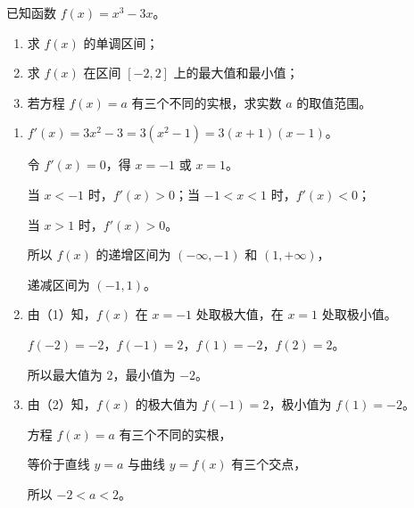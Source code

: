 \documentclass{exam-zh}
\begin{document}
\begin{problem}[points = 25]
  已知函数 $f(x) = x^3 - 3x$。

  \begin{enumerate}
    \item 求 $f(x)$ 的单调区间；
    \item 求 $f(x)$ 在区间 $[-2, 2]$ 上的最大值和最小值；
    \item 若方程 $f(x) = a$ 有三个不同的实根，求实数 $a$ 的取值范围。
  \end{enumerate}

  \begin{solution}
    \begin{enumerate}
      \item $f'(x) = 3x^2 - 3 = 3(x^2 - 1) = 3(x + 1)(x - 1)$。

      令 $f'(x) = 0$，得 $x = -1$ 或 $x = 1$。

      当 $x < -1$ 时，$f'(x) > 0$；当 $-1 < x < 1$ 时，$f'(x) < 0$；

      当 $x > 1$ 时，$f'(x) > 0$。

      所以 $f(x)$ 的递增区间为 $(-\infty, -1)$ 和 $(1, +\infty)$，

      递减区间为 $(-1, 1)$。

      \item 由（1）知，$f(x)$ 在 $x = -1$ 处取极大值，在 $x = 1$ 处取极小值。

      $f(-2) = -2$，$f(-1) = 2$，$f(1) = -2$，$f(2) = 2$。

      所以最大值为 $2$，最小值为 $-2$。

      \item 由（2）知，$f(x)$ 的极大值为 $f(-1) = 2$，极小值为 $f(1) = -2$。

      方程 $f(x) = a$ 有三个不同的实根，

      等价于直线 $y = a$ 与曲线 $y = f(x)$ 有三个交点，

      所以 $-2 < a < 2$。
    \end{enumerate}
  \end{solution}
\end{problem}
\end{document}
